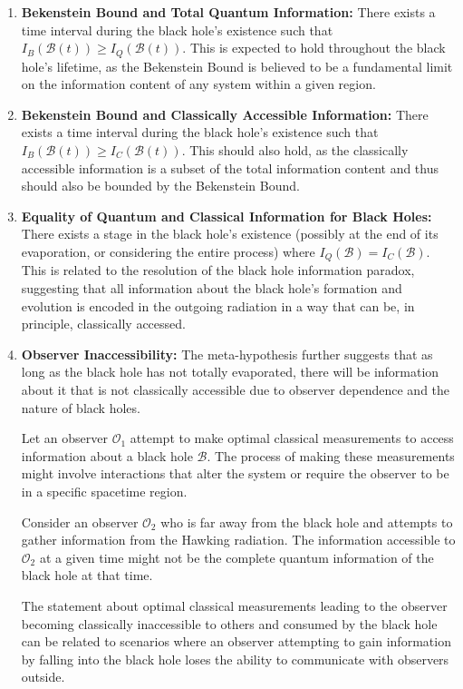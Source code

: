 \documentclass{article}
\begin{document}
	\begin{enumerate}
		\item \textbf{Bekenstein Bound and Total Quantum Information:} There exists a time interval during the black hole's existence such that $I_B(\mathcal{B}(t)) \ge I_Q(\mathcal{B}(t))$. This is expected to hold throughout the black hole's lifetime, as the Bekenstein Bound is believed to be a fundamental limit on the information content of any system within a given region.
		
		\item \textbf{Bekenstein Bound and Classically Accessible Information:} There exists a time interval during the black hole's existence such that $I_B(\mathcal{B}(t)) \ge I_C(\mathcal{B}(t))$. This should also hold, as the classically accessible information is a subset of the total information content and thus should also be bounded by the Bekenstein Bound.
		
		\item \textbf{Equality of Quantum and Classical Information for Black Holes:} There exists a stage in the black hole's existence (possibly at the end of its evaporation, or considering the entire process) where $I_Q(\mathcal{B}) = I_C(\mathcal{B})$. This is related to the resolution of the black hole information paradox, suggesting that all information about the black hole's formation and evolution is encoded in the outgoing radiation in a way that can be, in principle, classically accessed.
		
		\item \textbf{Observer Inaccessibility:} The meta-hypothesis further suggests that as long as the black hole has not totally evaporated, there will be information about it that is not classically accessible due to observer dependence and the nature of black holes.
		
		Let an observer $\mathcal{O}_1$ attempt to make optimal classical measurements to access information about a black hole $\mathcal{B}$. The process of making these measurements might involve interactions that alter the system or require the observer to be in a specific spacetime region.
		
		Consider an observer $\mathcal{O}_2$ who is far away from the black hole and attempts to gather information from the Hawking radiation. The information accessible to $\mathcal{O}_2$ at a given time might not be the complete quantum information of the black hole at that time.
		
		The statement about optimal classical measurements leading to the observer becoming classically inaccessible to others and consumed by the black hole can be related to scenarios where an observer attempting to gain information by falling into the black hole loses the ability to communicate with observers outside.
		

\end{enumerate}
\end{document}
